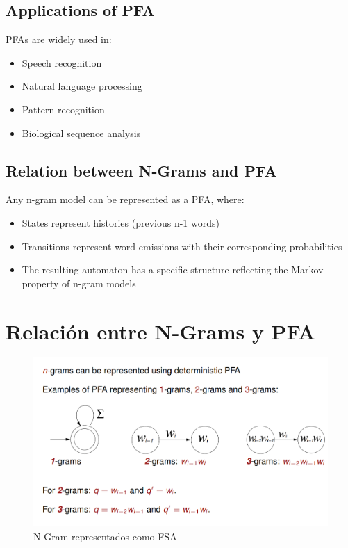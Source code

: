 \subsection{Applications of PFA}

PFAs are widely used in:
\begin{itemize}
   \item Speech recognition
   \item Natural language processing
   \item Pattern recognition
   \item Biological sequence analysis
\end{itemize}

\subsection{Relation between N-Grams and PFA}

Any n-gram model can be represented as a PFA, where:
\begin{itemize}
   \item States represent histories (previous n-1 words)
   \item Transitions represent word emissions with their corresponding probabilities
   \item The resulting automaton has a specific structure reflecting the Markov property of n-gram models
\end{itemize}


\section{Relación entre N-Grams y PFA}

\begin{figure}[htbp]
   \centering
   \includegraphics{images/07/ngramFSA.png}
   \caption{N-Gram representados como FSA}
   \label{fig:07/ngramFSA}
\end{figure}


